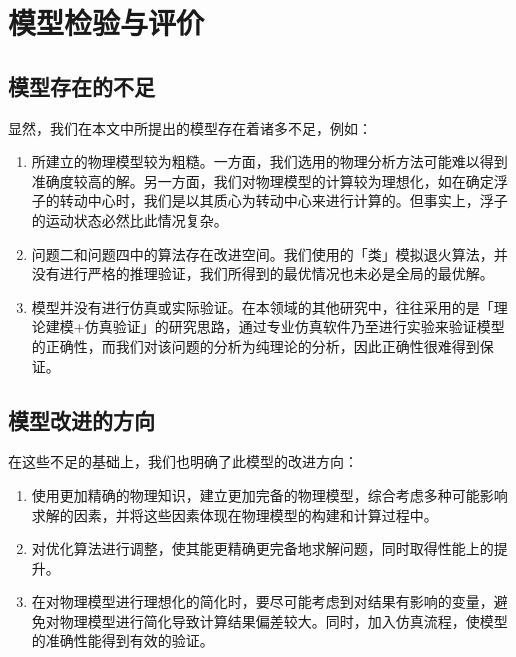 \section{模型检验与评价}


\subsection{模型存在的不足}

显然，我们在本文中所提出的模型存在着诸多不足，例如：

\begin{enumerate}
    \item 所建立的物理模型较为粗糙。一方面，我们选用的物理分析方法可能难以得到准确度较高的解。另一方面，我们对物理模型的计算较为理想化，如在确定浮子的转动中心时，我们是以其质心为转动中心来进行计算的。但事实上，浮子的运动状态必然比此情况复杂。
    \item 问题二和问题四中的算法存在改进空间。我们使用的「类」模拟退火算法，并没有进行严格的推理验证，我们所得到的最优情况也未必是全局的最优解。
    \item 模型并没有进行仿真或实际验证。在本领域的其他研究中，往往采用的是「理论建模+仿真验证」的研究思路，通过专业仿真软件乃至进行实验来验证模型的正确性，而我们对该问题的分析为纯理论的分析，因此正确性很难得到保证。
\end{enumerate}

\subsection{模型改进的方向}

在这些不足的基础上，我们也明确了此模型的改进方向：

\begin{enumerate}
    \item 使用更加精确的物理知识，建立更加完备的物理模型，综合考虑多种可能影响求解的因素，并将这些因素体现在物理模型的构建和计算过程中。
    \item 对优化算法进行调整，使其能更精确更完备地求解问题，同时取得性能上的提升。
    \item 在对物理模型进行理想化的简化时，要尽可能考虑到对结果有影响的变量，避免对物理模型进行简化导致计算结果偏差较大。同时，加入仿真流程，使模型的准确性能得到有效的验证。
\end{enumerate}